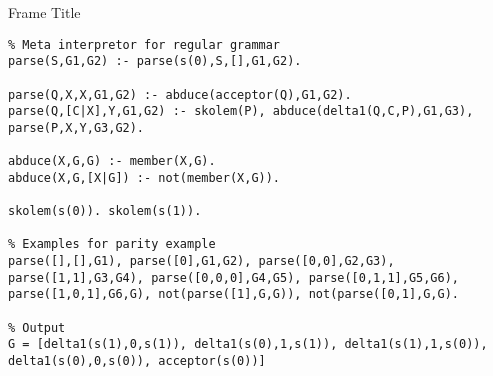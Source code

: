 \begin{frame}[fragile]{Frame Title}
\begin{verbatim}
% Meta interpretor for regular grammar
parse(S,G1,G2) :- parse(s(0),S,[],G1,G2).

parse(Q,X,X,G1,G2) :- abduce(acceptor(Q),G1,G2).
parse(Q,[C|X],Y,G1,G2) :- skolem(P), abduce(delta1(Q,C,P),G1,G3), parse(P,X,Y,G3,G2).

abduce(X,G,G) :- member(X,G).
abduce(X,G,[X|G]) :- not(member(X,G)).

skolem(s(0)). skolem(s(1)).

% Examples for parity example
parse([],[],G1), parse([0],G1,G2), parse([0,0],G2,G3), parse([1,1],G3,G4), parse([0,0,0],G4,G5), parse([0,1,1],G5,G6), parse([1,0,1],G6,G), not(parse([1],G,G)), not(parse([0,1],G,G).

% Output
G = [delta1(s(1),0,s(1)), delta1(s(0),1,s(1)), delta1(s(1),1,s(0)), delta1(s(0),0,s(0)), acceptor(s(0))]
\end{verbatim}
\end{frame}
